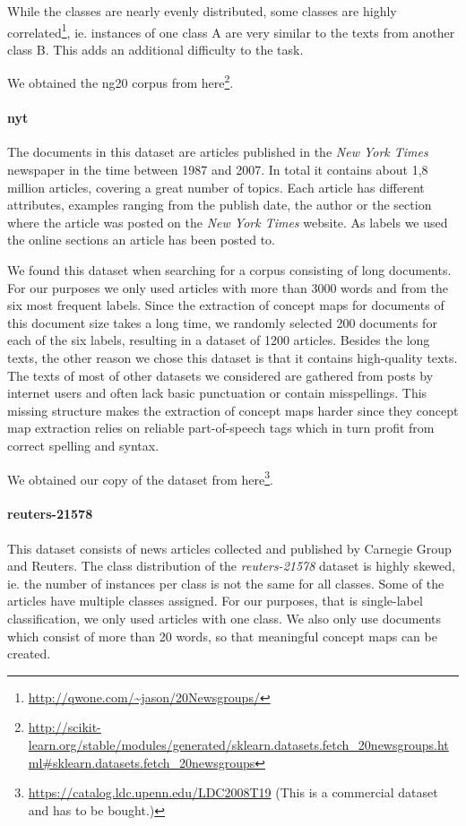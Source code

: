 While the classes are nearly evenly distributed, some classes are highly correlated\footnote{\url{http://qwone.com/~jason/20Newsgroups/}}, ie. instances of one class A are very similar to the texts from another class B. This adds an additional difficulty to the task.

We obtained the ng20 corpus from here\footnote{\url{http://scikit-learn.org/stable/modules/generated/sklearn.datasets.fetch\_20newsgroups.html\#sklearn.datasets.fetch_20newsgroups}}.

\paragraph{nyt}
The documents in this dataset are articles published in the \textit{New York Times} newspaper in the time between 1987 and 2007.
In total it contains about 1,8 million articles, covering a great number of topics.
Each article has different attributes, examples ranging from the publish date, the author or the section where the article was posted on the \textit{New York Times} website.
As labels we used the online sections an article has been posted to.

We found this dataset when searching for a corpus consisting of long documents. 
For our purposes we only used articles with more than 3000 words and from the six most frequent labels.
Since the extraction of concept maps for documents of this document size takes a long time, we randomly selected 200 documents for each of the six labels, resulting in a dataset of 1200 articles.
Besides the long texts, the other reason we chose this dataset is that it contains high-quality texts.
The texts of most of other datasets we considered are gathered from posts by internet users and often lack basic punctuation or contain misspellings.
This missing structure makes the extraction of concept maps harder since they concept map extraction relies on reliable part-of-speech tags which in turn profit from correct spelling and syntax. 

We obtained our copy of the dataset from here\footnote{\url{https://catalog.ldc.upenn.edu/LDC2008T19} (This is a commercial dataset and has to be bought.)}.

\paragraph{reuters-21578}
This dataset consists of news articles collected and published by Carnegie Group and Reuters.
 The class distribution of the \textit{reuters-21578} dataset is highly skewed, ie. the number of instances per class is not the same for all classes.
 Some of the articles have multiple classes assigned. For our purposes, that is single-label classification, we only used articles with one class.
 We also only use documents which consist of more than 20 words, so that meaningful concept maps can be created.

